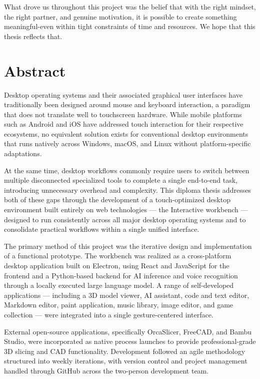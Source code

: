 \documentclass[a4paper,12pt]{article}
\begin{document}
What drove us throughout this project was the belief that with the right mindset, the right partner, and genuine motivation, it is possible to create something meaningful-even within tight
constraints of time and resources.
We hope that this thesis reflects that. 

\newpage
\tableofcontents
\newpage

\section{Abstract}
Desktop operating systems and their associated graphical user interfaces have traditionally been designed around mouse and keyboard interaction, a paradigm that does not translate well to touchscreen hardware. While mobile platforms such as Android and iOS have addressed touch interaction for their respective ecosystems, no equivalent solution exists for conventional desktop environments that runs natively across Windows, macOS, and Linux without platform-specific adaptations. 

At the same time, desktop workflows commonly require users to switch between multiple disconnected specialized tools to complete a single end-to-end task, introducing unnecessary overhead and complexity. This diploma thesis addresses both of these gaps through the development of a touch-optimized desktop environment built entirely on web technologies — the Interactive workbench — designed to run consistently across all major desktop operating systems and to consolidate practical workflows within a single unified interface.

The primary method of this project was the iterative design and implementation of a functional prototype. The workbench was realized as a cross-platform desktop application built on Electron, using React and JavaScript for the frontend and a Python-based backend for AI inference and voice recognition through a locally executed large language model. A range of self-developed applications — including a 3D model viewer, AI assistant, code and text editor, Markdown editor, paint application, music library, image editor, and game collection — were integrated into a single gesture-centered interface. 

External open-source applications, specifically OrcaSlicer, FreeCAD, and Bambu Studio, were incorporated as native process launches to provide professional-grade 3D slicing and CAD functionality. Development followed an agile methodology structured into weekly iterations, with version control and project management handled through GitHub across the two-person development team.
\end{document}
